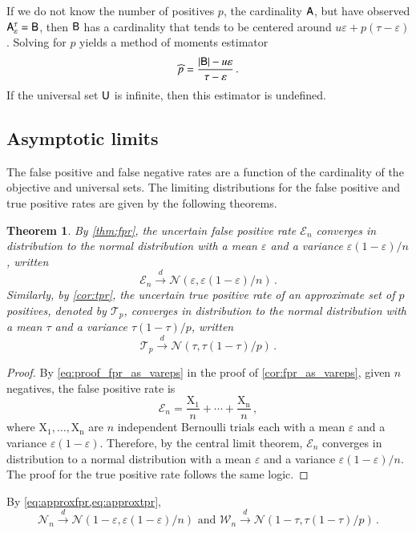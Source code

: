 \documentclass[10pt,final,hidelinks]{article}
\numberwithin{equation}{section}
\DeclarePairedDelimiter\Card{\lvert}{\rvert}
\newcommand{\FNR}{\mathcal{W}}
\newcommand{\TNR}{\mathcal{N}}
\newcommand{\FPR}{\mathcal{E}}
\newcommand{\TPR}{\mathcal{T}}
\newcommand{\tprate}{\tau}
\newcommand{\fprate}{\varepsilon}
\newcommand{\RV}[1]{\mathrm{#1}}
\newcommand{\normdist}{\mathcal{N}}
\newcommand{\envnumstyle}{chapter}
\renewcommand{\envnumstyle}{chapter}
\renewcommand{\envnumstyle}{section}
\theoremstyle{plain}
\newtheorem{theorem}{Theorem}[\envnumstyle]
\begin{document}
If we do not know the number of positives $p$, the cardinality $\Set{A}$, but have observed $\ASet{A}[\fprate][\tprate] = \Set{B}$, then $\Set{B}$ has a cardinality that tends to be centered around $u \fprate + p (\tprate - \fprate)$.
Solving for $p$ yields a method of moments estimator
\begin{equation}
	\widehat{p} = \frac{\Card{\Set{B}} - u \fprate}{\tprate - \fprate}\,.
\end{equation}
If the universal set $\Set{U}$ is infinite, then this estimator is undefined.

\subsection{Asymptotic limits}
\label{sec:asymtotic}
The false positive and false negative rates are a function of the cardinality of the objective and universal sets.
The limiting distributions for the false positive and true positive rates are given by the following theorems.
\begin{theorem}
    \label{thm:approxfpr}
    By \cref{thm:fpr}, the uncertain false positive rate $\FPR_n$ converges in
    distribution to the normal distribution with a mean $\fprate$ and a 
    variance $\fprate(1-\fprate)/n$, written
    \begin{equation}
    \label{eq:approxfpr}
	    \FPR_n \xrightarrow{d} \normdist(\fprate, \fprate(1-\fprate) / n)\,.
    \end{equation}
    Similarly, by \cref{cor:tpr}, the uncertain true positive rate of an approximate  set of $p$ positives, denoted by $\TPR_p$, converges in distribution to the normal distribution with a mean $\tprate$ and a variance $\tprate(1-\tprate)/p$, written
    \begin{equation}
    \label{eq:approxtpr}
    	\TPR_p \xrightarrow{d} \normdist(\tprate, \tprate(1-\tprate) / p)\,.
    \end{equation}
\end{theorem}
\begin{proof}
    By \cref{eq:proof_fpr_as_vareps} in the proof of \cref{cor:fpr_as_vareps}, 
    given 
    $n$ negatives, the false positive rate is
    \begin{equation}
    	\FPR_n = \frac{\RV{X_1}}{n} + \cdots + \frac{\RV{X_n}}{n}\,,
    \end{equation}
    where $\RV{X_1},\ldots,\RV{X_n}$ are $n$ independent Bernoulli trials each with a mean $\fprate$ and a variance $\fprate(1-\fprate)$.
    Therefore, by the central limit theorem, $\FPR_n$ converges in distribution to a normal distribution with a mean $\fprate$  and a variance $\fprate(1-\fprate)/n$.
    The proof for the true positive rate follows the same logic.
\end{proof}
By \cref{eq:approxfpr,eq:approxtpr},
\begin{equation}
	\TNR_n \xrightarrow{d} \normdist\!\left(1-\fprate, \fprate(1-\fprate) / n\right) \text{ and } \FNR_n \xrightarrow{d} \normdist\!\left(1-\tprate, \tprate(1-\tprate) / p\right)\,.	
\end{equation}
\end{document}
